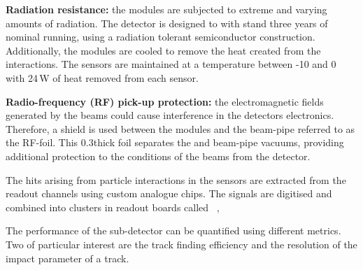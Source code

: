 \begin{description}   
\item \textbf{Radiation resistance:} the \velo modules are subjected to extreme and varying amounts of radiation. The detector is designed to with stand three years of nominal \lhc running, using a radiation tolerant semiconductor construction. Additionally, the \velo modules are cooled to remove the heat created from the interactions. The sensors are maintained at a temperature between -10 and 0 with 24\,W of heat removed from each sensor.  
\item \textbf{Radio-frequency (RF) pick-up protection:} the electromagnetic fields generated by the \lhc beams could cause interference in the \velo detectors electronics. Therefore, a shield is used between the modules and the beam-pipe referred to as the RF-foil. This 0.3\mm thick foil separates the \velo and beam-pipe vacuums, providing additional protection to the conditions of the beams from the detector.
\end{description}   

The hits arising from particle interactions in the \velo sensors are extracted from the readout channels using custom analogue chips. The signals are digitised and combined into clusters in readout boards called \tellone~\cite{HAEFELI2006494}, 


The performance of the \velo sub-detector can be quantified using different metrics. Two of particular interest are the track finding efficiency and the resolution of the impact parameter of a track. 


